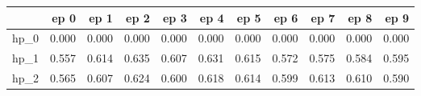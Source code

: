 \begin{tabular}{lrrrrrrrrrr}
\toprule
{} &   ep 0 &   ep 1 &   ep 2 &   ep 3 &   ep 4 &   ep 5 &   ep 6 &   ep 7 &   ep 8 &   ep 9 \\
\midrule
hp\_0 &  0.000 &  0.000 &  0.000 &  0.000 &  0.000 &  0.000 &  0.000 &  0.000 &  0.000 &  0.000 \\
hp\_1 &  0.557 &  0.614 &  0.635 &  0.607 &  0.631 &  0.615 &  0.572 &  0.575 &  0.584 &  0.595 \\
hp\_2 &  0.565 &  0.607 &  0.624 &  0.600 &  0.618 &  0.614 &  0.599 &  0.613 &  0.610 &  0.590 \\
\bottomrule
\end{tabular}
